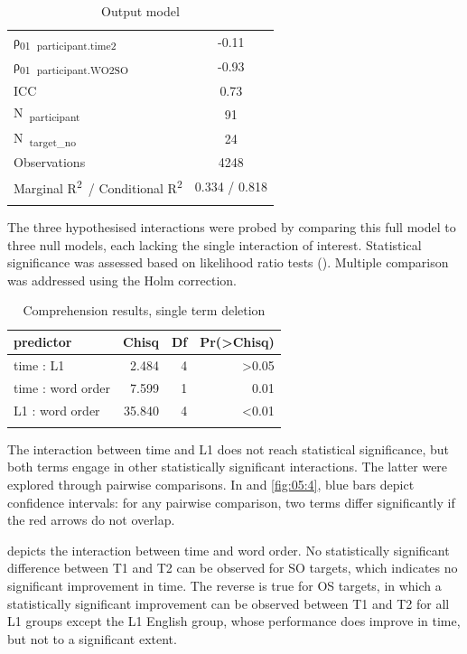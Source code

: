 \begin{table}
\begin{tabularx}{\textwidth}{Xrrr}
    ρ\textsubscript{01}~\textsubscript{participant.time2} & \multicolumn{3}{c}{{}-0.11}\\
    ρ\textsubscript{01}~\textsubscript{participant.WO2SO} & \multicolumn{3}{c}{{}-0.93}\\
    ICC & \multicolumn{3}{c}{0.73}\\
    N~\textsubscript{participant} & \multicolumn{3}{c}{91}\\
    N~\textsubscript{target\_no} & \multicolumn{3}{c}{24}\\
    \midrule
    Observations & \multicolumn{3}{c}{4248}\\
    Marginal R\textsuperscript{2}~/ Conditional R\textsuperscript{2} & \multicolumn{3}{c}{0.334 / 0.818}\\
    \lspbottomrule
    \end{tabularx}
    \caption{Output model}
    \label{tab:05:3}
\end{table}

The three hypothesised interactions were probed by comparing this full model to three null models, each lacking the single interaction of interest. Statistical significance was assessed based on likelihood ratio tests (). Multiple comparison was addressed using the Holm correction.

\begin{table}
    \begin{tabularx}{\textwidth}{Xrrr}
    \lsptoprule
    predictor & Chisq & Df & Pr(>Chisq)\\
    \midrule
    time : L1 & 2.484 & 4 & >0.05\\
    time : word order & 7.599 & 1 & 0.01\\
    L1 : word order & 35.840 & 4 & <0.01\\
    \lspbottomrule
    \end{tabularx}
    \caption{Comprehension results, single term deletion}
    \label{tab:05:4}
\end{table}

The interaction between time and L1 does not reach statistical significance, but both terms engage in other statistically significant interactions. The latter were explored through pairwise comparisons. In  and \ref{fig:05:4}, blue bars depict confidence intervals: for any pairwise comparison, two terms differ significantly if the red arrows do not overlap.

 depicts the interaction between time and word order. No statistically significant difference between T1 and T2 can be observed for SO targets, which indicates no significant improvement in time. The reverse is true for OS targets, in which a statistically significant improvement can be observed between T1 and T2 for all L1 groups except the L1 English group, whose performance does improve in time, but not to a significant extent.

